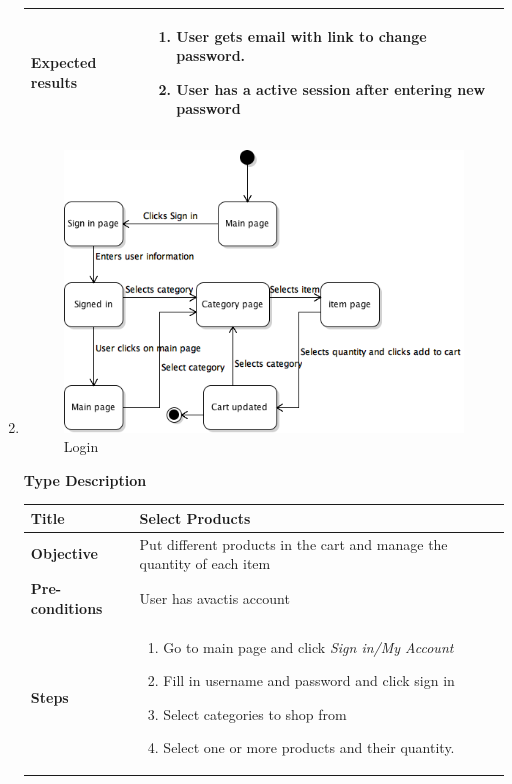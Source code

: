 \documentclass[UKenglish,12pt]{article}
\begin{document}
\begin{enumerate}
\begin{tabular}{| p{5cm} | p{10cm} | }
	 \textbf{Expected results} & \begin{enumerate} \item User gets email with link to change password. \item User has a active session after entering new password \end{enumerate} \\ 
	 \hline
\end{tabular} %

\item
\begin{figure}[!h]
\centering
\includegraphics[scale=0.7,keepaspectratio]{Images/SelectProducts.png}
\caption{Login}
\end{figure}
\newpage
\textbf{\hspace{0.3cm}Type\hspace{4.4cm} Description}
\newline \vspace{0.2cm}
\begin{tabular}{| p{5cm} | p{10cm} | }
	\hline
	 \textbf{Title} & Select Products \\ \hline
	 \textbf{Objective} & Put different products in the cart and manage the quantity of each item \\ \hline
	 \textbf{Pre-conditions} & User has avactis account \\ \hline
	 \textbf{Steps} & \begin{enumerate} \item Go to main page and click \textit{Sign in/My Account} \item Fill in username and password and click sign in \item Select categories to shop from \item Select one or more products and their quantity.

\end{enumerate}
\end{tabular}
\end{enumerate}
\end{document}
